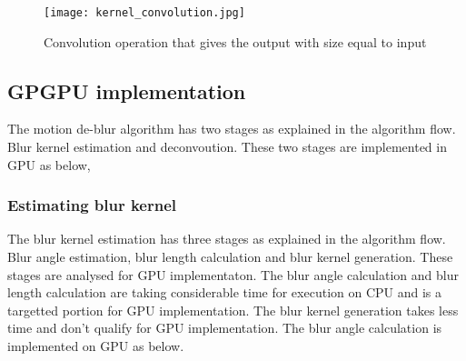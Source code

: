 \begin{figure}[h!]
	\centering
	\texttt{[image: kernel\_convolution.jpg]}
	\caption{Convolution operation that gives the output with size equal to input \cite{convolution}}
	\label{fig:convolution}
\end{figure}
\subsection{GPGPU implementation}
The motion de-blur algorithm has two stages as explained in the algorithm flow. Blur kernel estimation and deconvoution. These two stages are implemented in GPU as below,

\subsubsection{Estimating blur kernel}
The blur kernel estimation has three stages as explained in the algorithm flow. Blur angle estimation, blur length calculation and blur kernel generation. These stages are analysed for GPU implementaton. The blur angle calculation and blur length calculation are taking considerable time for execution on CPU and is a targetted portion for GPU implementation. The blur kernel generation takes less time and don't qualify for GPU implementation. The blur angle calculation is implemented on GPU as below.

